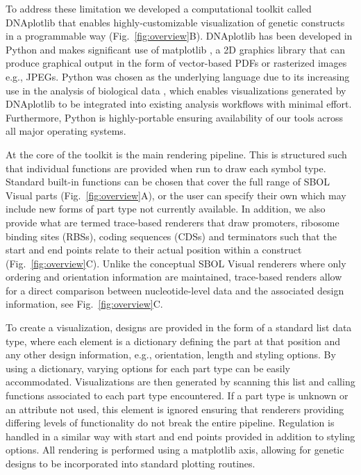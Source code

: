 \documentclass{bioinfo}
\begin{document}
To address these limitation we developed a computational toolkit called DNAplotlib that enables highly-customizable visualization of genetic constructs in a programmable way (Fig.~\ref{fig:overview}B). DNAplotlib has been developed in Python and makes significant use of matplotlib \citep{Hunter07a}, a 2D graphics library that can produce graphical output in the form of vector-based PDFs or rasterized images e.g., JPEGs. Python was chosen as the underlying language due to its increasing use in the analysis of biological data \citep{Cock09a}, which enables visualizations generated by DNAplotlib to be integrated into existing analysis workflows with minimal effort. Furthermore, Python is highly-portable ensuring availability of our tools across all major operating systems.

At the core of the toolkit is the main rendering pipeline. This is structured such that individual functions are provided when run to draw each symbol type. Standard built-in functions can be chosen that cover the full range of SBOL Visual parts (Fig.~\ref{fig:overview}A), or the user can specify their own which may include new forms of part type not currently available. In addition, we also provide what are termed trace-based renderers that draw promoters, ribosome binding sites (RBSs), coding sequences (CDSs) and terminators such that the start and end points relate to their actual position within a construct (Fig.~\ref{fig:overview}C). Unlike the conceptual SBOL Visual renderers where only ordering and orientation information are maintained, trace-based renders allow for a direct comparison between nucleotide-level data and the associated design information, see Fig.~\ref{fig:overview}C.

To create a visualization, designs are provided in the form of a standard list data type, where each element is a dictionary defining the part at that position and any other design information, e.g., orientation, length and styling options. By using a dictionary, varying options for each part type can be easily accommodated. Visualizations are then generated by scanning this list and calling functions associated to each part type encountered. If a part type is unknown or an attribute not used, this element is ignored ensuring that renderers providing differing levels of functionality do not break the entire pipeline. Regulation is handled in a similar way with start and end points provided in addition to styling options. All rendering is performed using a matplotlib axis, allowing for genetic designs to be incorporated into standard plotting routines.
\end{document}
